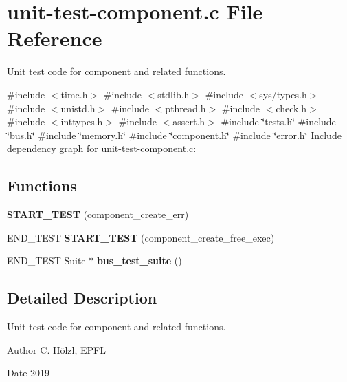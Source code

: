 \hypertarget{unit-test-component_8c}{}\section{unit-\/test-\/component.c File Reference}
\label{unit-test-component_8c}


Unit test code for component and related functions.  


{\ttfamily \#include $<$time.\+h$>$}\newline
{\ttfamily \#include $<$stdlib.\+h$>$}\newline
{\ttfamily \#include $<$sys/types.\+h$>$}\newline
{\ttfamily \#include $<$unistd.\+h$>$}\newline
{\ttfamily \#include $<$pthread.\+h$>$}\newline
{\ttfamily \#include $<$check.\+h$>$}\newline
{\ttfamily \#include $<$inttypes.\+h$>$}\newline
{\ttfamily \#include $<$assert.\+h$>$}\newline
{\ttfamily \#include \char`\"{}tests.\+h\char`\"{}}\newline
{\ttfamily \#include \char`\"{}bus.\+h\char`\"{}}\newline
{\ttfamily \#include \char`\"{}memory.\+h\char`\"{}}\newline
{\ttfamily \#include \char`\"{}component.\+h\char`\"{}}\newline
{\ttfamily \#include \char`\"{}error.\+h\char`\"{}}\newline
Include dependency graph for unit-\/test-\/component.c\+:
\subsection*{Functions}
\begin{DoxyCompactItemize}
\item 
\mbox{\label{unit-test-component_8c_a2ee14c3d0a635d05b5515965368517ad}} 
{\bfseries S\+T\+A\+R\+T\+\_\+\+T\+E\+ST} (component\+\_\+create\+\_\+err)
\item 
\mbox{\label{unit-test-component_8c_a958bf9e7ff5fd4a58d252d4097a3f70d}} 
E\+N\+D\+\_\+\+T\+E\+ST {\bfseries S\+T\+A\+R\+T\+\_\+\+T\+E\+ST} (component\+\_\+create\+\_\+free\+\_\+exec)
\item 
\mbox{\label{unit-test-component_8c_a9942b766a70847794d9eba89f6f01b42}} 
E\+N\+D\+\_\+\+T\+E\+ST Suite $\ast$ {\bfseries bus\+\_\+test\+\_\+suite} ()
\end{DoxyCompactItemize}


\subsection{Detailed Description}
Unit test code for component and related functions. 

\begin{DoxyAuthor}{Author}
C. Hölzl, E\+P\+FL 
\end{DoxyAuthor}
\begin{DoxyDate}{Date}
2019 
\end{DoxyDate}
